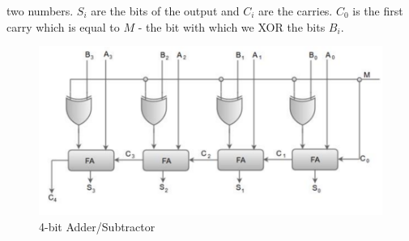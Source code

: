 \documentclass[a4paper, titlepage]{article}
\begin{document}
two numbers. $S_i$ are the bits of the output and $C_i$ are the carries. $C_0$ is the first carry 
which is equal to $M$ - the bit with which we XOR the bits $B_i$.
\begin{figure}[htp]
    \centering
    \hypertarget{4AS}{\includegraphics[scale = 0.6]{Image_4-bit_Add-Sub.png}}
    \caption{4-bit Adder/Subtractor}
    \label{fig:fig2}
\end{figure}
\end{document}
